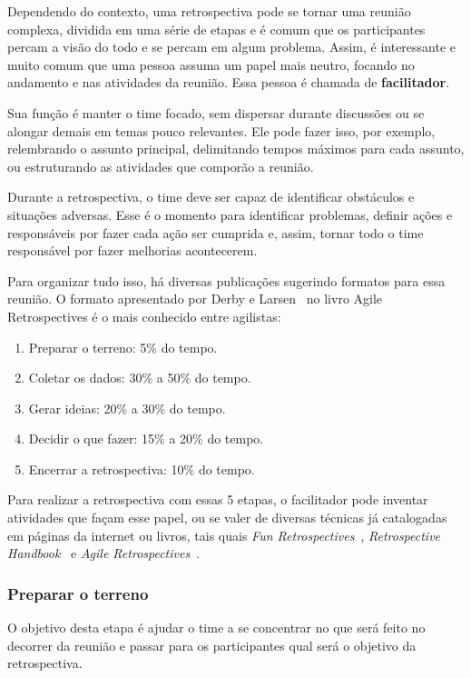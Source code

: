 Dependendo do contexto, uma retrospectiva pode se tornar uma reunião complexa, dividida em uma série de etapas e é comum que os participantes percam a visão do todo e se percam em algum problema. Assim, é interessante e muito comum que uma pessoa assuma um papel mais neutro, focando no andamento e nas atividades da reunião. Essa pessoa é chamada de \textbf{facilitador}.

Sua função é manter o time focado, sem dispersar durante discussões ou se alongar demais em temas pouco relevantes. Ele pode fazer isso, por exemplo, relembrando o assunto principal, delimitando tempos máximos para cada assunto, ou estruturando as atividades que comporão a reunião.

Durante a retrospectiva, o time deve ser capaz de identificar obstáculos e situações adversas. Esse é o momento para identificar problemas, definir ações e responsáveis por fazer cada ação ser cumprida e, assim, tornar todo o time responsável por fazer melhorias acontecerem.

Para organizar tudo isso, há diversas publicações sugerindo formatos para essa reunião. O formato apresentado por Derby e Larsen~\cite{retrospectives} no livro Agile Retrospectives é o mais conhecido entre agilistas:

\begin{enumerate}
	\item Preparar o terreno: 5\% do tempo.
	\item Coletar os dados: 30\% a 50\% do tempo.
	\item Gerar ideias: 20\% a 30\% do tempo.
	\item Decidir o que fazer: 15\% a 20\% do tempo.
	\item Encerrar a retrospectiva: 10\% do tempo.
\end{enumerate}

Para realizar a retrospectiva com essas 5 etapas, o facilitador pode inventar atividades que façam esse papel, ou se valer de diversas técnicas já catalogadas em páginas da internet ou livros, tais quais \textit{Fun Retrospectives}~\cite{funRetrospectives}, \textit{Retrospective Handbook}~\cite{handRetrospectives} e \textit{Agile Retrospectives}~\cite{retrospectives}.

\subsubsection*{Preparar o terreno}

O objetivo desta etapa é ajudar o time a se concentrar no que será feito no decorrer da reunião e passar para os participantes qual será o objetivo da retrospectiva.

